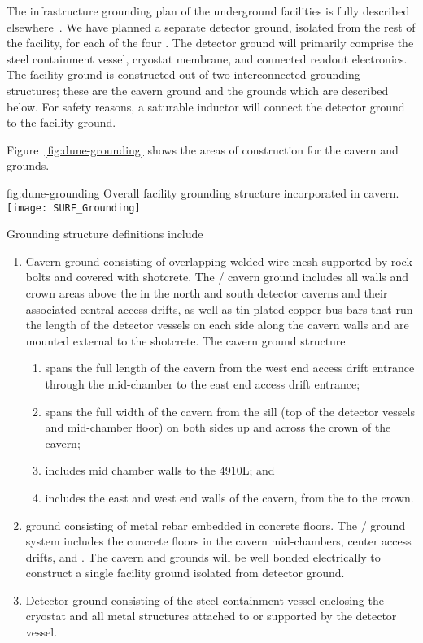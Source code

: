 The infrastructure grounding plan of the underground facilities is
fully described elsewhere~\cite{bib:cernedms2095975}. %
We have planned a separate detector ground, isolated from the rest of the facility, for each of the four .    
The detector ground will primarily 
comprise the steel containment vessel, cryostat membrane, and
connected readout electronics.  The facility ground is constructed out
of two interconnected grounding structures; these are the cavern
ground and the  grounds which are described below.  For safety
reasons, a saturable inductor will connect the detector ground to the
facility ground.

Figure~\ref{fig:dune-grounding} shows the areas of construction for
the cavern and  grounds.
\begin{dunefigure}{fig:dune-grounding}
  {Overall  facility grounding structure incorporated in cavern.}
  \texttt{[image: SURF\_Grounding]}
\end{dunefigure}
Grounding structure definitions include 
\begin{enumerate}
 \item Cavern ground consisting of overlapping welded wire mesh
   supported by rock bolts and covered with shotcrete. The
   / cavern ground includes all walls and
   crown areas above the  in the north and south detector
   caverns and their associated central access drifts, as well as tin-plated
   copper bus bars that run the length of the detector vessels
   on each side along the cavern walls and are mounted external to the
   shotcrete.  The cavern ground structure
\begin{enumerate}
 \item spans the full length of the cavern from the west end access
   drift entrance through the mid-chamber to the east end access drift
   entrance;
 \item spans the full width of the cavern from the  sill
   (top of the detector vessels and mid-chamber floor) on both sides
   up and across the crown of the cavern;
 \item includes mid chamber walls to the 4910L; and 
 \item includes the east and west end walls of the cavern, from the
    to the crown.
\end{enumerate}
 \item {} ground consisting of metal rebar embedded in
   concrete floors. The /  ground
   system includes the concrete floors in the cavern mid-chambers,
   center access drifts, and . The cavern and
    grounds will be well bonded electrically to construct
   a single facility ground isolated from detector ground.
 \item Detector ground consisting of the steel containment vessel
   enclosing the cryostat and all metal structures attached to or
   supported by the detector vessel.
\end{enumerate}


